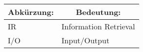 \renewcommand{\arraystretch}{1.5}
\begin{center}
	\begin{tabular}{|l|l|}\hline
		\multicolumn{1}{|c|}{\textbf{Abkürzung:}} & \multicolumn{1}{c|}{\textbf{Bedeutung:}} \\ \hline
		IR & Information Retrieval \\ \hline
		I/O & Input/Output \\ \hline
	\end{tabular}
\end{center}
